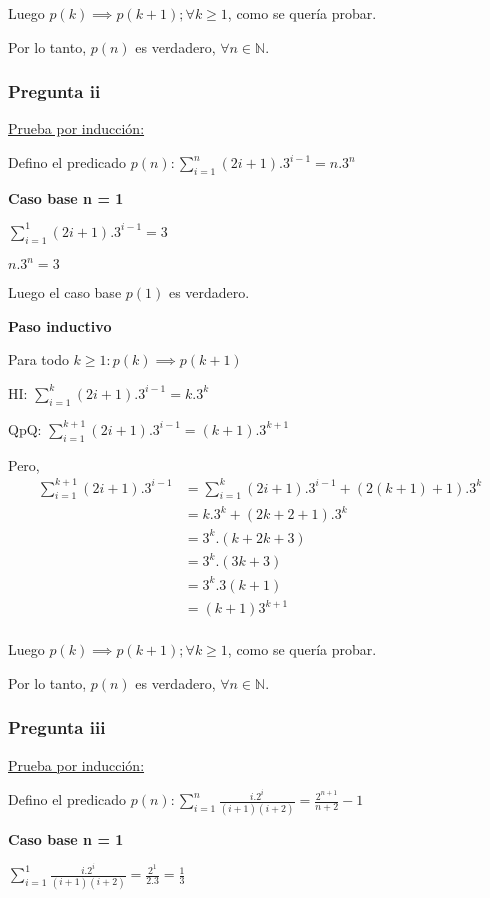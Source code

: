 Luego $p(k) \implies p(k+1); \forall k \geq 1$, como se quería probar.

Por lo tanto, $p(n)$ es verdadero, $\forall n \in \mathbb{N}$.

\subsubsection{Pregunta ii}

\underline{Prueba por inducción:}

Defino el predicado $p(n) : \sum_{i=1}^{n}(2i+1).3^{i-1}= n.3^n$

\textbf{Caso base n = 1}

$\sum_{i=1}^{1}(2i+1).3^{i-1} = 3$

$n.3^n = 3$

Luego el caso base $p(1)$ es verdadero.

\textbf{Paso inductivo}

Para todo $k \geq 1: p(k) \implies p(k+1)$

HI: $\sum_{i=1}^{k}(2i+1).3^{i-1} = k.3^k$

QpQ: $\sum_{i=1}^{k+1}(2i+1).3^{i-1} = (k+1).3^{k+1}$

Pero,
\begin{align*}
    \sum_{i=1}^{k+1}(2i+1).3^{i-1} &= \sum_{i=1}^{k}(2i+1).3^{i-1} + \left( 2(k+1) + 1 \right).3^k \\
    &= k.3^k + (2k+2+1).3^k \\
    &= 3^k.(k+2k+3) \\
    &= 3^k.(3k+3) \\
    &= 3^k.3(k+1) \\
    &= (k+1)3^{k+1} \\
\end{align*}

Luego $p(k) \implies p(k+1); \forall k \geq 1$, como se quería probar.

Por lo tanto, $p(n)$ es verdadero, $\forall n \in \mathbb{N}$.

\subsubsection{Pregunta iii}

\underline{Prueba por inducción:}

Defino el predicado $p(n) : \sum_{i=1}^{n}\frac{i.2^i}{(i+1)(i+2)}= \frac{2^{n+1}}{n+2}-1$

\textbf{Caso base n = 1}

$ \sum_{i=1}^{1}\frac{i.2^i}{(i+1)(i+2)} = \frac{2^1}{2.3} = \frac{1}{3} $

